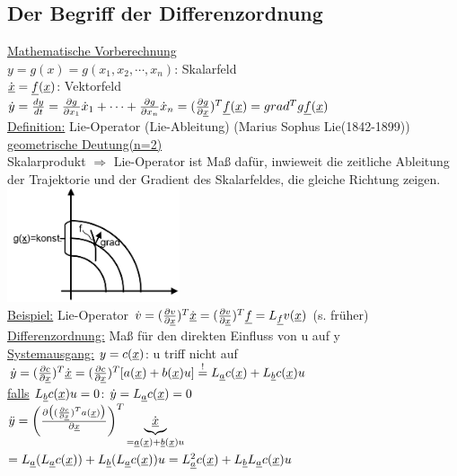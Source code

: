 \documentclass[openany,a4paper,11pt]{book}
\begin{document}
\subsection{Der Begriff der Differenzordnung}
\uline{Mathematische Vorberechnung}\\
$y=g(x)=g(x_1,x_2,\cdots,x_n)$: Skalarfeld\\
$\dot{\uline{x}}=\uline{f}(\uline{x})$: Vektorfeld\\
$\dot{y}=\frac{dy}{dt}=\frac{\partial g}{\partial x_1}\dot{x}_1+\cdots +\frac{\partial g}{\partial x_n}\dot{x}_n=(\frac{\partial g}{\partial \uline{x}})^T\uline{f}(\uline{x})=grad^T g \uline{f}(\uline{x})$\\
\uline{Definition:}  Lie-Operator (Lie-Ableitung)  (Marius Sophus Lie(1842-1899))\\
\uline{geometrische Deutung(n=2)}\\
Skalarprodukt $\Rightarrow$ Lie-Operator ist Maß dafür, inwieweit die zeitliche Ableitung der Trajektorie und der Gradient des Skalarfeldes, die gleiche Richtung zeigen.\\
\includegraphics[width=2in]{imgs/NLR43.png}\\
\uline{Beispiel:} Lie-Operator $\dot{v}=(\frac{\partial v}{\partial \uline{x}})^T\dot{\uline{x}}=(\frac{\partial v}{\partial \uline{x}})^T\uline{f}=L_{\uline{f}}v(\uline{x})$ (s. früher)\\
\uline{Differenzordnung:} Maß für den direkten Einfluss von u auf y\\
\uline{Systemausgang:} $y=c(\uline{x})$: u triff nicht auf\\
$\dot{y}=(\frac{\partial c}{\partial \uline{x}})^T\dot{\uline{x}}=(\frac{\partial c}{\partial \uline{x}})^T[a(\uline{x})+b(\uline{x})u]\stackrel{!}{=}L_{\uline{a}}c(\uline{x})+L_{\uline{b}}c(\uline{x})u$\\
\uline{falls} $L_{\uline{b}}c(\uline{x})u=0$: \quad $\dot{y}=L_{\uline{a}}c(\uline{x})=0$\\
$\ddot{y}=\bigg(\frac{\partial\big( (\frac{\partial c}{\partial \uline{x}})^Ta(\uline{x})\big)}{\partial \uline{x}}\bigg)^T\underbrace{\dot{\uline{x}}}_{=\uline{a}(\uline{x})+\uline{b}(\uline{x})u}$ $=L_{\uline{a}}(L_{\uline{a}}c(\uline{x}))+L_{\uline{b}}(L_{\uline{a}}c(\uline{x}))u=L_{\uline{a}}^2c(\uline{x})+L_{\uline{b}}L_{\uline{a}}c(\uline{x})u$\\
\end{document}
